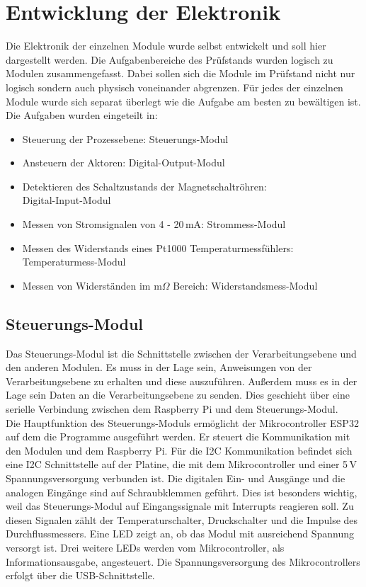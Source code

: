 \section{Entwicklung der Elektronik}
Die Elektronik der einzelnen Module wurde selbst entwickelt und soll hier dargestellt werden. Die Aufgabenbereiche des Prüfstands wurden logisch zu Modulen zusammengefasst. Dabei sollen sich die Module im Prüfstand nicht nur logisch sondern auch physisch voneinander abgrenzen. Für jedes der einzelnen Module wurde sich separat überlegt wie die Aufgabe am besten zu bewältigen ist. Die Aufgaben wurden eingeteilt in:
\begin{itemize}
\itemsep0em
	\item Steuerung der Prozessebene: Steuerungs-Modul
	\item Ansteuern der Aktoren: Digital-Output-Modul
	\item Detektieren des Schaltzustands der Magnetschaltröhren:\\
	Digital-Input-Modul
	\item Messen von Stromsignalen von 4 - 20\,mA: Strommess-Modul
	\item Messen des Widerstands eines Pt1000 Temperaturmessfühlers:\\ Temperaturmess-Modul
	\item Messen von Widerständen im m\(\Omega\) Bereich: Widerstandsmess-Modul
\end{itemize}

\subsection{Steuerungs-Modul}
Das Steuerungs-Modul ist die Schnittstelle zwischen der Verarbeitungsebene und den anderen Modulen. Es muss in der Lage sein, Anweisungen von der Verarbeitungsebene zu erhalten und diese auszuführen. Außerdem muss es in der Lage sein Daten an die Verarbeitungsebene zu senden. Dies geschieht über eine serielle Verbindung zwischen dem Raspberry Pi und dem Steuerungs-Modul.
\\
Die Hauptfunktion des Steuerungs-Moduls ermöglicht der Mikrocontroller ESP32 auf dem die Programme ausgeführt werden. Er steuert die Kommunikation mit den Modulen und dem Raspberry Pi. Für die I2C Kommunikation befindet sich eine I2C Schnittstelle auf der Platine, die mit dem Mikrocontroller und einer 5\,V Spannungsversorgung verbunden ist. Die digitalen Ein- und Ausgänge und die analogen Eingänge sind auf Schraubklemmen geführt. Dies ist besonders wichtig, weil das Steuerungs-Modul auf Eingangssignale mit Interrupts reagieren soll. Zu diesen Signalen zählt der Temperaturschalter, Druckschalter und die Impulse des Durchflussmessers. Eine LED zeigt an, ob das Modul mit ausreichend Spannung versorgt ist. Drei weitere LEDs werden vom Mikrocontroller, als Informationsausgabe, angesteuert. Die Spannungsversorgung des Mikrocontrollers erfolgt über die USB-Schnittstelle.


